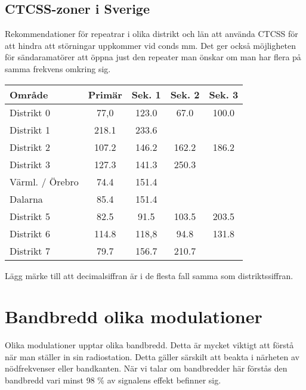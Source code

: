 \subsection{CTCSS-zoner i Sverige}

Rekommendationer för repeatrar i olika distrikt och län att använda CTCSS för att hindra att störningar uppkommer vid conds mm. Det ger också möjligheten för sändaramatörer att öppna just den repeater man önskar om man har flera på samma frekvens omkring sig.

\begin{tabular}{lcccc}
	\textbf{Område} & \textbf{Primär} & \textbf{Sek. 1} & \textbf{Sek. 2} & \textbf{Sek. 3} \\ \hline
	Distrikt 0      &      77,0       &      123.0      &      67.0       &      100.0      \\
	Distrikt 1      &      218.1      &      233.6      &                 &  \\
	Distrikt 2      &      107.2      &      146.2      &      162.2      &      186.2      \\
	Distrikt 3      &      127.3      &      141.3      &      250.3      &  \\
	Värml. / Örebro &      74.4       &      151.4      &                 &  \\
	Dalarna         &      85.4       &      151.4      &                 &  \\
	Distrikt 5      &      82.5       &      91.5       &      103.5      &      203.5      \\
	Distrikt 6      &      114.8      &      118,8      &      94.8       &      131.8      \\
	Distrikt 7      &      79.7       &      156.7      &      210.7      &
\end{tabular}

Lägg märke till att decimalsiffran är i de flesta fall samma som distriktssiffran.

\section{Bandbredd olika modulationer}

Olika modulationer upptar olika bandbredd. Detta är mycket viktigt att förstå när man ställer in sin radiostation. Detta gäller särskilt att beakta i närheten av nödfrekvenser eller bandkanten. När vi talar om bandbredder här förstås den bandbredd vari minst 98 \% av signalens effekt befinner sig.

